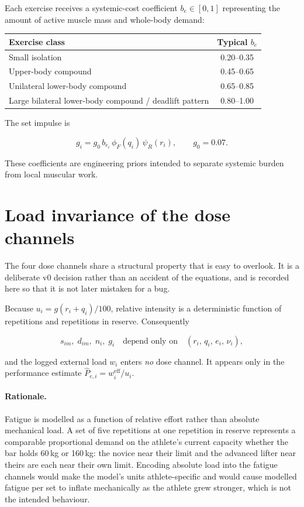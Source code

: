 \documentclass[11pt]{article}
\begin{document}
Each exercise receives a systemic-cost coefficient $b_e\in[0,1]$ representing the amount of active muscle mass and whole-body demand:

\begin{center}
\begin{tabular}{lc}
\toprule
Exercise class & Typical $b_e$ \\
\midrule
Small isolation & 0.20--0.35 \\
Upper-body compound & 0.45--0.65 \\
Unilateral lower-body compound & 0.65--0.85 \\
Large bilateral lower-body compound / deadlift pattern & 0.80--1.00 \\
\bottomrule
\end{tabular}
\end{center}

The set impulse is

\begin{equation}
g_i=g_0\,b_{e_i}\,\phi_F(q_i)\,\psi_R(r_i),
\qquad g_0=0.07.
\end{equation}

These coefficients are engineering priors intended to separate systemic burden from local muscular work.

\section{Load invariance of the dose channels}
\label{sec:loadinv}

The four dose channels share a structural property that is easy to overlook. It is a deliberate v0 decision rather than an accident of the equations, and is recorded here so that it is not later mistaken for a bug.

Because $u_i=g(r_i+q_i)/100$, relative intensity is a deterministic function of repetitions and repetitions in reserve. Consequently

\begin{equation}
s_{im},\;d_{im},\;n_i,\;g_i
\quad\text{depend only on}\quad
(r_i,\,q_i,\,e_i,\,\nu_i),
\end{equation}

and the logged external load $w_i$ enters \emph{no} dose channel. It appears only in the performance estimate $\widehat P_{e,i}=w_i^{\mathrm{eff}}/u_i$.

\paragraph{Rationale.} Fatigue is modelled as a function of relative effort rather than absolute mechanical load. A set of five repetitions at one repetition in reserve represents a comparable proportional demand on the athlete's current capacity whether the bar holds 60\,kg or 160\,kg: the novice near their limit and the advanced lifter near theirs are each near their own limit. Encoding absolute load into the fatigue channels would make the model's units athlete-specific and would cause modelled fatigue per set to inflate mechanically as the athlete grew stronger, which is not the intended behaviour.
\end{document}
